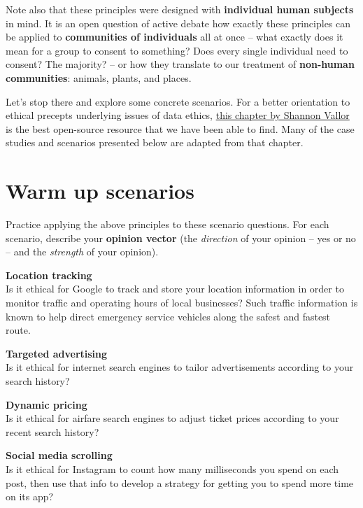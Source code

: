 \documentclass[]{book}
\begin{document}
Note also that these principles were designed with \textbf{individual human subjects} in mind. It is an open question of active debate how exactly these principles can be applied to \textbf{communities of individuals} all at once -- what exactly does it mean for a group to consent to something? Does every single individual need to consent? The majority? -- or how they translate to our treatment of \textbf{non-human communities}: animals, plants, and places.

Let's stop there and explore some concrete scenarios. For a better orientation to ethical precepts underlying issues of data ethics, \href{https://www.scu.edu/media/ethics-center/technology-ethics/IntroToDataEthics.pdf}{this chapter by Shannon Vallor} is the best open-source resource that we have been able to find. Many of the case studies and scenarios presented below are adapted from that chapter.

\hypertarget{warm-up-scenarios}{%
\section*{Warm up scenarios}\label{warm-up-scenarios}}

Practice applying the above principles to these scenario questions. For each scenario, describe your \textbf{opinion vector} (the \emph{direction} of your opinion -- yes or no -- and the \emph{strength} of your opinion).

\textbf{Location tracking}\\
Is it ethical for Google to track and store your location information in order to monitor traffic and operating hours of local businesses? Such traffic information is known to help direct emergency service vehicles along the safest and fastest route.

\textbf{Targeted advertising}\\
Is it ethical for internet search engines to tailor advertisements according to your search history?

\textbf{Dynamic pricing}\\
Is it ethical for airfare search engines to adjust ticket prices according to your recent search history?

\textbf{Social media scrolling}\\
Is it ethical for Instagram to count how many milliseconds you spend on each post, then use that info to develop a strategy for getting you to spend more time on its app?
\end{document}
